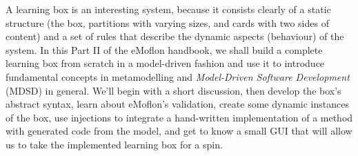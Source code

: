 A learning box is an interesting system, because it consists clearly of a static structure (the box, partitions with varying sizes, and cards with two sides
of content) and a set of rules that describe the dynamic aspects (behaviour) of the system. In this Part II of the eMoflon handbook,
we shall build a complete learning box from scratch in a model-driven fashion and use it to introduce fundamental concepts in metamodelling and \emph{Model-Driven Software 
Development} (MDSD) in general. We'll begin with a short discussion, then develop the box's abstract syntax, learn about eMoflon's validation, create
some dynamic instances of the box, use injections to integrate a hand-written implementation of a method with generated code from the model, and get to know a
small GUI that will allow us to take the implemented learning box for a spin.
